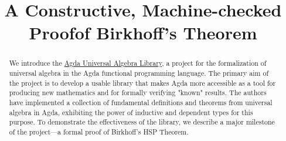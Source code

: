 \documentclass[sigplan,screen]{acmart}
\begin{document}
\title{A Constructive, Machine-checked Proof\break of Birkhoff's Theorem}

\author{}

\begin{abstract}
We introduce the \href{https://ualib.org}{Agda Universal Algebra Library}, a project for the formalization of universal algebra in the Agda functional programming language. The primary aim of the project is to develop a usable library that makes Agda more accessible as a tool for producing new mathematics and for formally verifying "known" results.  The authors have implemented a collection of fundamental definitions and theorems from universal algebra in Agda, exhibiting the power of inductive and dependent types for this purpose.  To demonstrate the effectiveness of the library, we describe a major milestone of the project---a formal proof of Birkhoff's HSP Theorem.
\end{abstract}
\end{document}
